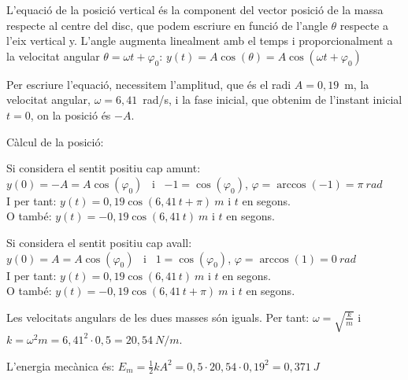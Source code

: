 \begin{solapartat}
 L'equació de la posició vertical és la component del vector posició de la massa respecte al centre del disc, que podem escriure en funció de l'angle $\theta$ respecte a l'eix vertical y. L'angle augmenta linealment amb el temps i proporcionalment a la velocitat angular $\theta = \omega t + \varphi_0$: $y(t) = A\cos(\theta) = A\cos(\omega t + \varphi_0)$


 Per escriure l'equació, necessitem l'amplitud, que és el radi $A = 0,19$~m, la velocitat angular, $\omega = 6,41$~rad/s, i la fase inicial, que obtenim de l'instant inicial $t = 0$, on la posició és $-A$.

 Càlcul de la posició:

Si considera el sentit positiu cap amunt:\\
$y(0) = -A = A\cos(\varphi_0)$ \ i \ $-1 = \cos(\varphi_0)$, $\varphi = \arccos(-1) = \pi\ rad$\\
I per tant: $y(t) = 0,19\cos(6,41\,t + \pi)\ m$ i $t$ en segons.\\
O també: $y(t) = -0,19\cos(6,41\,t)\ m$ i $t$ en segons.

Si considera el sentit positiu cap avall:\\
$y(0) = A = A\cos(\varphi_0)$ \ i \ $1 = \cos(\varphi_0)$, $\varphi = \arccos(1) = 0\ rad$\\
I per tant: $y(t) = 0,19\cos(6,41\,t)\ m$ i $t$ en segons.\\
O també: $y(t) = -0,19\cos(6,41\,t + \pi)\ m$ i $t$ en segons.

 Les velocitats angulars de les dues masses són iguals. Per tant: $\omega = \sqrt{\frac{k}{m}}$ i $k = \omega^2 m = 6,41^2\cdot 0,5 = 20,54\ N/m$.

 L'energia mecànica és: $E_m = \frac{1}{2}kA^2 = 0,5\cdot 20,54\cdot 0,19^2 = 0,371\ J$
\end{solapartat}

